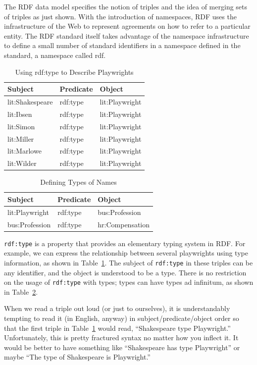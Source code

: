 The RDF data model specifies the notion of triples and the idea of
merging sets of triples as just shown. With the introduction of
namespaces, RDF uses the infrastructure of the Web to represent
agreements on how to refer to a particular entity. The RDF standard itself takes
advantage of the namespace infrastructure to define a small number of
standard identifiers in a namespace defined in the standard, a namespace
called rdf.


\begin{table}[h]
\centering
\begin{tabular}{||l l l ||} 
 \hline
 Subject&Predicate&Object \\ [0.5ex] 
 \hline\hline
lit:Shakespeare&rdf:type&lit:Playwright \\
lit:Ibsen&rdf:type&lit:Playwright \\
lit:Simon&rdf:type&lit:Playwright \\
lit:Miller&rdf:type&lit:Playwright \\
lit:Marlowe&rdf:type&lit:Playwright \\
lit:Wilder&rdf:type&lit:Playwright \\
\hline
\end{tabular}
\caption{Using rdf:type to Describe Playwrights}
\label{tab:ch3.9}
\end{table}


\begin{table}[h]
\centering
\begin{tabular}{||l l l ||} 
 \hline
 Subject&Predicate&Object \\ [0.5ex] 
 \hline\hline
lit:Playwright&rdf:type&bus:Profession \\
bus:Profession&rdf:type&hr:Compensation \\
\hline
\end{tabular}
\caption{Defining Types of Names}
\label{tab:ch3.10}
\end{table}



\texttt{rdf:type} is a property that provides an elementary typing system in RDF.
For example, we can express the relationship between several playwrights
using type information, as shown in Table~\ref{tab:ch3.9}. The subject of \texttt{rdf:type}
in these triples can be any identifier, and the object is understood to
be a type. There is no restriction on the usage of \texttt{rdf:type}
with types;
types can have types ad infinitum, as shown in Table~\ref{tab:ch3.10}.

When we read a triple out loud (or just to ourselves), it is
understandably tempting to read it (in English, anyway) in
subject/predicate/object order so that the first triple in Table~\ref{tab:ch3.9}
would read, ``Shakespeare type Playwright.'' Unfortunately, this is
pretty fractured syntax no matter how you inflect it. It would be better
to have something like ``Shakespeare has type Playwright'' or maybe
``The type of Shakespeare is Playwright.''

